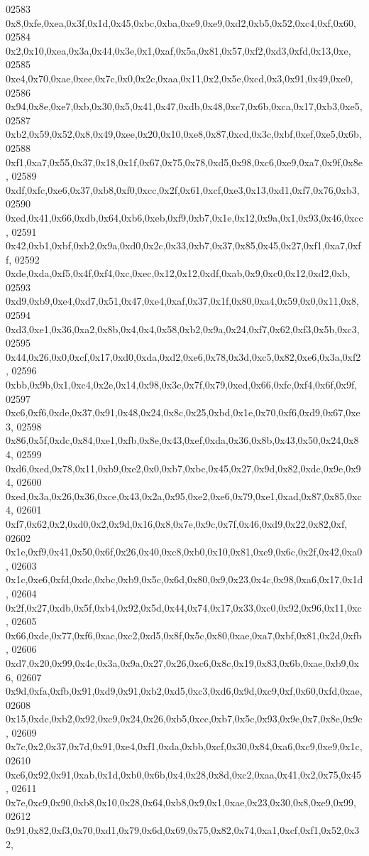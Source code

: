 \begin{DoxyCode}
02583   0x8,0xfe,0xea,0x3f,0x1d,0x45,0xbc,0xba,0xe9,0xe9,0xd2,0xb5,0x52,0xc4,0xf,0x60,
02584   0x2,0x10,0xea,0x3a,0x44,0x3e,0x1,0xaf,0x5a,0x81,0x57,0xf2,0xd3,0xfd,0x13,0xe,
02585   0xe4,0x70,0xae,0xee,0x7c,0x0,0x2c,0xaa,0x11,0x2,0x5e,0xcd,0x3,0x91,0x49,0xe0,
02586   0x94,0x8e,0xe7,0xb,0x30,0x5,0x41,0x47,0xdb,0x48,0xc7,0x6b,0xca,0x17,0xb3,0xe5,
02587   0xb2,0x59,0x52,0x8,0x49,0xee,0x20,0x10,0xe8,0x87,0xcd,0x3c,0xbf,0xef,0xe5,0x6b,
02588   0xf1,0xa7,0x55,0x37,0x18,0x1f,0x67,0x75,0x78,0xd5,0x98,0xc6,0xe9,0xa7,0x9f,0x8e,
02589   0xdf,0xfc,0xe6,0x37,0xb8,0xf0,0xcc,0x2f,0x61,0xcf,0xe3,0x13,0xd1,0xf7,0x76,0xb3,
02590   0xed,0x41,0x66,0xdb,0x64,0xb6,0xeb,0xf9,0xb7,0x1e,0x12,0x9a,0x1,0x93,0x46,0xcc,
02591   0x42,0xb1,0xbf,0xb2,0x9a,0xd0,0x2c,0x33,0xb7,0x37,0x85,0x45,0x27,0xf1,0xa7,0xff,
02592   0xde,0xda,0xf5,0x4f,0xf4,0xc,0xec,0x12,0x12,0xdf,0xab,0x9,0xc0,0x12,0xd2,0xb,
02593   0xd9,0xb9,0xe4,0xd7,0x51,0x47,0xe4,0xaf,0x37,0x1f,0x80,0xa4,0x59,0x0,0x11,0x8,
02594   0xd3,0xe1,0x36,0xa2,0x8b,0x4,0x4,0x58,0xb2,0x9a,0x24,0xf7,0x62,0xf3,0x5b,0xc3,
02595   0x44,0x26,0x0,0xcf,0x17,0xd0,0xda,0xd2,0xe6,0x78,0x3d,0xc5,0x82,0xe6,0x3a,0xf2,
02596   0xbb,0x9b,0x1,0xc4,0x2e,0x14,0x98,0x3c,0x7f,0x79,0xed,0x66,0xfc,0xf4,0x6f,0x9f,
02597   0xc6,0xf6,0xde,0x37,0x91,0x48,0x24,0x8c,0x25,0xbd,0x1e,0x70,0xf6,0xd9,0x67,0xe3,
02598   0x86,0x5f,0xdc,0x84,0xe1,0xfb,0x8e,0x43,0xef,0xda,0x36,0x8b,0x43,0x50,0x24,0x84,
02599   0xd6,0xed,0x78,0x11,0xb9,0xe2,0x0,0xb7,0xbc,0x45,0x27,0x9d,0x82,0xdc,0x9e,0x94,
02600   0xed,0x3a,0x26,0x36,0xce,0x43,0x2a,0x95,0xe2,0xe6,0x79,0xe1,0xad,0x87,0x85,0xc4,
02601   0xf7,0x62,0x2,0xd0,0x2,0x9d,0x16,0x8,0x7e,0x9c,0x7f,0x46,0xd9,0x22,0x82,0xf,
02602   0x1e,0xf9,0x41,0x50,0x6f,0x26,0x40,0xc8,0xb0,0x10,0x81,0xe9,0x6c,0x2f,0x42,0xa0,
02603   0x1c,0xe6,0xfd,0xdc,0xbc,0xb9,0x5c,0x6d,0x80,0x9,0x23,0x4c,0x98,0xa6,0x17,0x1d,
02604   0x2f,0x27,0xdb,0x5f,0xb4,0x92,0x5d,0x44,0x74,0x17,0x33,0xc0,0x92,0x96,0x11,0xc,
02605   0x66,0xde,0x77,0xf6,0xac,0xc2,0xd5,0x8f,0x5c,0x80,0xae,0xa7,0xbf,0x81,0x2d,0xfb,
02606   0xd7,0x20,0x99,0x4c,0x3a,0x9a,0x27,0x26,0xc6,0x8c,0x19,0x83,0x6b,0xae,0xb9,0x6,
02607   0x9d,0xfa,0xfb,0x91,0xd9,0x91,0xb2,0xd5,0xc3,0xd6,0x9d,0xc9,0xf,0x60,0xfd,0xae,
02608   0x15,0xdc,0xb2,0x92,0xc9,0x24,0x26,0xb5,0xcc,0xb7,0x5c,0x93,0x9e,0x7,0x8e,0x9c,
02609   0x7c,0x2,0x37,0x7d,0x91,0xe4,0xf1,0xda,0xbb,0xcf,0x30,0x84,0xa6,0xc9,0xe9,0x1c,
02610   0xc6,0x92,0x91,0xab,0x1d,0xb0,0x6b,0x4,0x28,0x8d,0xc2,0xaa,0x41,0x2,0x75,0x45,
02611   0x7e,0xc9,0x90,0xb8,0x10,0x28,0x64,0xb8,0x9,0x1,0xae,0x23,0x30,0x8,0xe9,0x99,
02612   0x91,0x82,0xf3,0x70,0xd1,0x79,0x6d,0x69,0x75,0x82,0x74,0xa1,0xcf,0xf1,0x52,0x32,

\end{DoxyCode}
